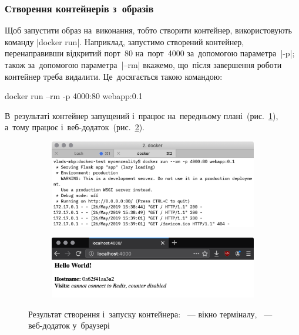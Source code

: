 \documentclass[
	a4paper,
	oneside,
	BCOR = 10mm,
	DIV = 12,
	12pt,
	headings = normal,
]{scrartcl}
\newlength{\gridunitwidth}
\begin{document}
				\subsubsection{Створення контейнерів з~образів}
					Щоб запустити образ на~виконання, тобто створити контейнер, використовують команду \bashinline|docker run|. Наприклад, запустимо створений контейнер, перенаправивши відкритий порт~80 на~порт~4000 за~допомогою параметра~\bashinline|-p|; також за~допомогою параметра~\bashinline|--rm| вкажемо, що~після завершення роботи контейнер треба видалити. Це~досягається такою командою:
					\begin{bashterm}
						docker run --rm -p 4000:80 webapp:0.1
					\end{bashterm}
					В~результаті контейнер запущений і~працює на~передньому плані~(рис.~\ref{subfig:docker-run-res-term}), а~тому працює і~веб-додаток~(рис.~\ref{subfig:docker-run-res-webapp}).

					\begin{figure}[!htbp]
						\centering
						\begin{subfigure}{\columnwidth}
							\centering
							\includegraphics[width=10\gridunitwidth]{./assets/y03s02-syssoft-homework-01-p03a.png}
							\caption{}
							\label{subfig:docker-run-res-term}
						\end{subfigure}
						\begin{subfigure}{\columnwidth}
							\centering
							\includegraphics[width=10\gridunitwidth]{./assets/y03s02-syssoft-homework-01-p03b.png}
							\caption{}
							\label{subfig:docker-run-res-webapp}
						\end{subfigure}
						\caption{Результат створення і~запуску контейнера: ~— вікно терміналу, ~— веб-додаток у~браузері}
						\label{fig:docker-run-res}
					\end{figure}
\end{document}
